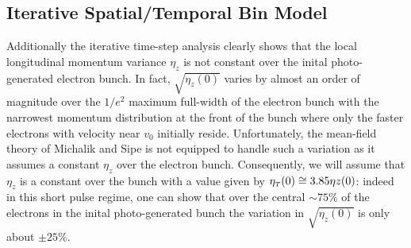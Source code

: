 \subsection{Iterative Spatial/Temporal Bin Model}

Additionally the iterative time-step analysis clearly shows that the local longitudinal momentum variance $ \eta_{ z } $ is not constant over the inital photo-generated electron bunch.
In fact, $ \sqrt{ \eta_{ z } ( 0 ) } $ varies by almost an order of magnitude over the $ 1/e^{2} $ maximum full-width of the electron bunch with the narrowest momentum distribution at the front of the bunch where only the faster electrons with velocity near $ v_{ 0 } $ initially reside.
Unfortunately, the mean-field theory of Michalik and Sipe \cite{michalik_analytic_2006} is not equipped to handle such a variation as it assumes a constant $ \eta_{ z } $ over the electron bunch.
Consequently, we will assume that $ \eta_{ z } $ is a constant over the bunch with a value given by $ \eta_{{\scriptscriptstyle T} } ( 0 ) \cong 3.85 \eta{ z } ( 0 ) $: %
indeed in this short pulse regime, one can show that over the central $ \sim 75 \% $ of the electrons in the inital photo-generated bunch the variation in $ \sqrt{ \eta_{ z } ( 0 ) } $ is only about $ \pm 25 \% $.


